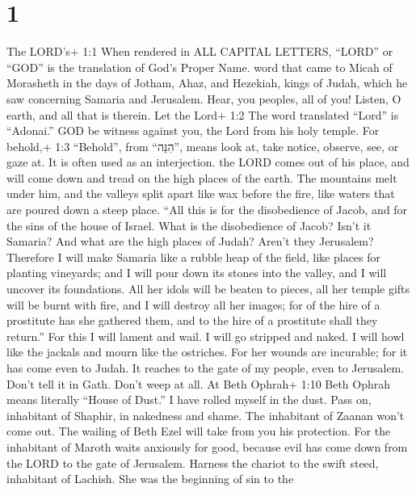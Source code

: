 \hypertarget{section}{%
\section{1}\label{section}}

 The LORD's+ 1:1 When rendered in ALL CAPITAL LETTERS,
``LORD'' or ``GOD'' is the translation of God's Proper Name. word that
came to Micah of Morasheth in the days of Jotham, Ahaz, and Hezekiah,
kings of Judah, which he saw concerning Samaria and Jerusalem.
 Hear, you peoples, all of you! Listen, O earth, and all
that is therein. Let the Lord+ 1:2 The word translated ``Lord'' is
``Adonai.'' GOD be witness against you, the Lord from his holy temple.
 For behold,+ 1:3 ``Behold'', from ``הִנֵּה'', means look
at, take notice, observe, see, or gaze at. It is often used as an
interjection. the LORD comes out of his place, and will come down and
tread on the high places of the earth.  The mountains melt
under him, and the valleys split apart like wax before the fire, like
waters that are poured down a steep place.  ``All this is
for the disobedience of Jacob, and for the sins of the house of Israel.
What is the disobedience of Jacob? Isn't it Samaria? And what are the
high places of Judah? Aren't they Jerusalem?  Therefore I
will make Samaria like a rubble heap of the field, like places for
planting vineyards; and I will pour down its stones into the valley, and
I will uncover its foundations.  All her idols will be
beaten to pieces, all her temple gifts will be burnt with fire, and I
will destroy all her images; for of the hire of a prostitute has she
gathered them, and to the hire of a prostitute shall they return.''
 For this I will lament and wail. I will go stripped and
naked. I will howl like the jackals and mourn like the ostriches.
 For her wounds are incurable; for it has come even to
Judah. It reaches to the gate of my people, even to Jerusalem.
 Don't tell it in Gath. Don't weep at all. At Beth Ophrah+
1:10 Beth Ophrah means literally ``House of Dust.'' I have rolled myself
in the dust.  Pass on, inhabitant of Shaphir, in nakedness
and shame. The inhabitant of Zaanan won't come out. The wailing of Beth
Ezel will take from you his protection.  For the inhabitant
of Maroth waits anxiously for good, because evil has come down from the
LORD to the gate of Jerusalem.  Harness the chariot to the
swift steed, inhabitant of Lachish. She was the beginning of sin to the
